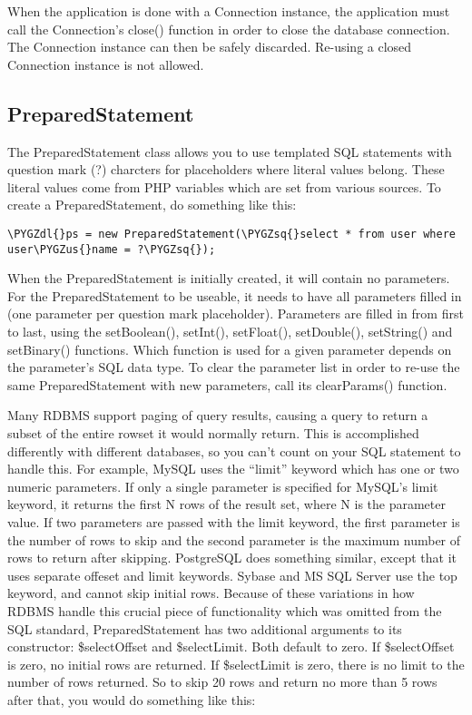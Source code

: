 \documentclass[letterpaper,10pt,english]{sphinxmanual}
\def\PYGZus{\char`\_}
\def\PYGZdl{\char`\$}
\def\PYGZsq{\char`\'}
\renewcommand\PYGZsq{\textquotesingle}
\begin{document}
When the application is done with a Connection instance, the application must call the Connection's
close() function in order to close the database connection.  The Connection instance can then be
safely discarded.  Re-using a closed Connection instance is not allowed.


\subsection{PreparedStatement}
\label{jaxFrameworkGuide:preparedstatement}
The PreparedStatement class allows you to use templated SQL statements with question mark (?)
charcters for placeholders where literal values belong.  These literal values come from PHP
variables which are set from various sources.  To create a PreparedStatement, do something like this:

\begin{Verbatim}[commandchars=\\\{\}]
\PYGZdl{}ps = new PreparedStatement(\PYGZsq{}select * from user where user\PYGZus{}name = ?\PYGZsq{});
\end{Verbatim}

When the PreparedStatement is initially created, it will contain no parameters.  For the
PreparedStatement to be useable, it needs to have all parameters filled in (one parameter per
question mark placeholder).  Parameters are filled in from first to last, using the setBoolean(),
setInt(), setFloat(), setDouble(), setString() and setBinary() functions.  Which function is used
for a given parameter depends on the parameter's SQL data type.  To clear the parameter list in
order to re-use the same PreparedStatement with new parameters, call its clearParams() function.

Many RDBMS support paging of query results, causing a query to return a subset of the entire rowset
it would normally return.  This is accomplished differently with different databases, so you can't
count on your SQL statement to handle this.  For example, MySQL uses the ``limit'' keyword which has
one or two numeric parameters.  If only a single parameter is specified for MySQL's limit keyword,
it returns the first N rows of the result set, where N is the parameter value.  If two parameters
are passed with the limit keyword, the first parameter is the number of rows to skip and the second
parameter is the maximum number of rows to return after skipping.  PostgreSQL does something
similar, except that it uses separate offeset and limit keywords.  Sybase and MS SQL Server use the
top keyword, and cannot skip initial rows.  Because of these variations in how RDBMS handle this
crucial piece of functionality which was omitted from the SQL standard, PreparedStatement has two
additional arguments to its constructor: \$selectOffset and \$selectLimit.  Both default to zero.  If
\$selectOffset is zero, no initial rows are returned.  If \$selectLimit is zero, there is no limit to
the number of rows returned.  So to skip 20 rows and return no more than 5 rows after that, you
would do something like this:
\end{document}
